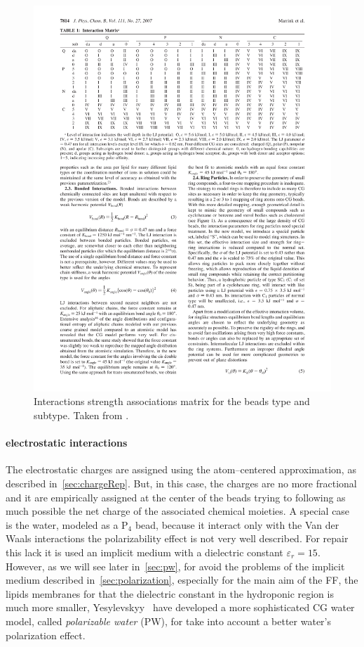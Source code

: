 \begin{figure}[!ht]
	\centering
	\includegraphics[width=1\textwidth]{img/martiniInteractions.pdf}
	\caption{Interactions strength associations matrix for the \martini beads type and subtype. Taken from \cite{Martini}.}
	\label{fig:martiniInteractions}
\end{figure}

\paragraph{\textbf{electrostatic interactions}} The electrostatic charges are assigned using the atom--centered approximation, as described in~\ref{sec:chargeRep}. But, in this case, the charges are no more fractional and it are empirically assigned at the center of the beads trying to following as much possible the net charge of the associated chemical moieties. A special case is the water, modeled as a P$_4$ bead, because it interact only with the Van der Waals interactions the polarizability effect is not very well described. For repair this lack it is used an implicit medium with a dielectric constant $\varepsilon_r = 15$. However, as we will see later in~\ref{sec:pw}, for avoid the problems of the implicit medium described in~\ref{sec:polarization}, especially for the main aim of the \martini \ac{FF}, the lipids membranes for that the dielectric constant in the hydroponic region is much more smaller, Yesylevskyy \etal\, \cite{PW} have developed a more sophisticated \ac{CG} water model, called \textit{polarizable water} (\acs{PW}), for take into account a better water's polarization effect.

